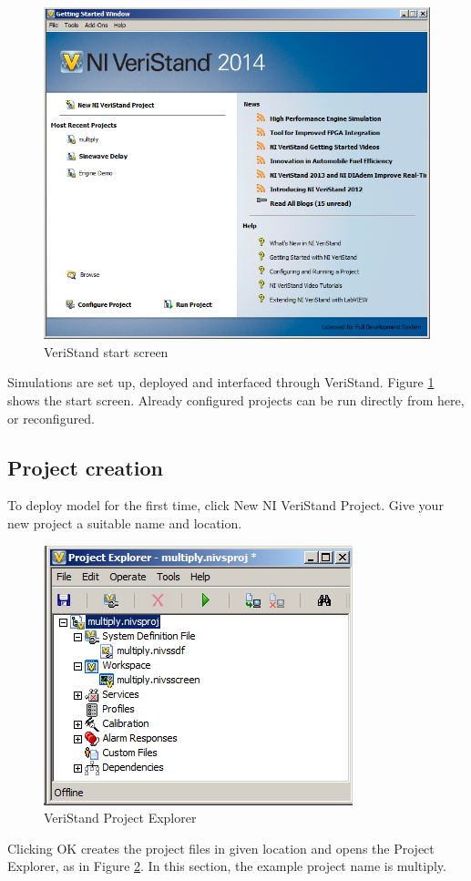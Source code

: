 \documentclass[a4paper,twoside,english]{report}
\begin{document}
\begin{figure}
\centering \includegraphics[scale=0.45]{fig/veristand} \caption{VeriStand start screen}

\label{fig: veristand} 
\end{figure}

Simulations are set up, deployed and interfaced through VeriStand.
Figure \ref{fig: veristand} shows the start screen. Already configured
projects can be run directly from here, or reconfigured.

\subsection{Project creation}

To deploy model for the first time, click New NI VeriStand Project.
Give your new project a suitable name and location. 
\begin{figure}[h]
\centering \includegraphics[scale=0.45]{fig/veristand_projectexplorer}
\caption{VeriStand Project Explorer}

\label{fig: veristand project explorer} 
\end{figure}
 Clicking OK creates the project files in given location and opens
the Project Explorer, as in Figure \ref{fig: veristand project explorer}.
In this section, the example project name is multiply.
\end{document}
